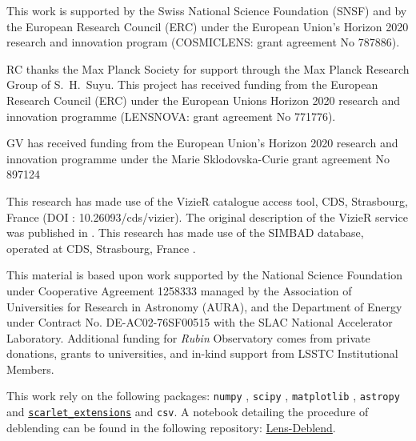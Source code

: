 \documentclass[tradiabstract,twocolumn]{aa}
\begin{document}
\begin{acknowledgements}

This work is supported by the Swiss National Science Foundation (SNSF) and by the European Research Council (ERC) under the European Union’s Horizon 2020 research and innovation program (COSMICLENS: grant agreement No 787886).

RC thanks the Max Planck Society for support through the Max Planck Research Group of S.~H.~Suyu. This project has received funding from the European Research Council (ERC) under the European Unions Horizon 2020 research and innovation programme (LENSNOVA: grant agreement No 771776). 

GV has received funding from the European Union’s Horizon 2020 research and innovation programme under the Marie Sklodovska-Curie grant agreement No 897124

This research has made use of the VizieR catalogue access tool, CDS, Strasbourg, France (DOI : 10.26093/cds/vizier). The original description of the VizieR service was published in \cite{vizier}.
This research has made use of the SIMBAD database, operated at CDS, Strasbourg, France \cite{simbad}.

This material is based upon work supported by the National Science Foundation under  Cooperative  Agreement  1258333  managed  by  the  Association  of  Universities for Research in Astronomy (AURA), and the Department of Energy under Contract  No.  DE-AC02-76SF00515 with  the  SLAC  National  Accelerator  Laboratory.  Additional funding  for  {\it Rubin}  Observatory  comes  from  private  donations, grants to universities, and in-kind support from LSSTC Institutional Members.

This work rely on the following packages: {\tt numpy} \citep{VanDerWalt2011}, {\tt scipy} \citep{Virtanen2020}, {\tt matplotlib} \citep{Hunter2007}, {\tt astropy} \citep{astropy2018} and \href{https://github.com/herjy/scarlet_extensions/releases/tag/paper}{\faGithub \tt scarlet\_extensions} and {\tt csv}. A notebook detailing the procedure of deblending can be found in the following repository: \href{https://github.com/herjy/Lens_deblend/releases/tag/prototype}{\faGithub Lens-Deblend}.


\end{acknowledgements}


%
%


\end{document}
